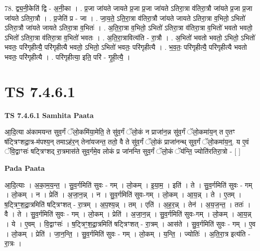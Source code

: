 \documentclass[17pt]{extarticle}
\begin{document}
78. द्व्य॒नी॒केति॑ द्वि - अ॒नी॒का । . प्र॒जा जा॑यते जायते प्र॒जा प्र॒जा जा॑यते ऽतिरा॒त्रा व॑तिरा॒त्रौ जा॑यते प्र॒जा प्र॒जा जा॑यते ऽतिरा॒त्रौ । . प्र॒जेति॑ प्र - जा । . जा॒य॒ते॒ ऽति॒रा॒त्रा व॑तिरा॒त्रौ जा॑यते जायते ऽतिरा॒त्रा व॒भितो॒ ऽभितो॑ ऽतिरा॒त्रौ जा॑यते जायते ऽतिरा॒त्रा व॒भितः॑ । . अ॒ति॒रा॒त्रा व॒भितो॒ ऽभितो॑ ऽतिरा॒त्रा व॑तिरा॒त्रा व॒भितो॑ भवतो भवतो॒ ऽभितो॑ ऽतिरा॒त्रा व॑तिरा॒त्रा व॒भितो॑ भवतः । . अ॒ति॒रा॒त्रावित्य॑ति - रा॒त्रौ । . अ॒भितो॑ भवतो भवतो॒ ऽभितो॒ ऽभितो॑ भवतः॒ परि॑गृहीत्यै॒ परि॑गृहीत्यै भवतो॒ ऽभितो॒ ऽभितो॑ भवतः॒ परि॑गृहीत्यै । . भ॒व॒तः॒ परि॑गृहीत्यै॒ परि॑गृहीत्यै भवतो भवतः॒ परि॑गृहीत्यै । . परि॑गृहीत्या॒ इति॒ परि॑ - गृ॒ही॒त्यै॒ । \newline
\pagebreak
{}

\section{ TS 7.4.6.1 }

\textbf{TS 7.4.6.1 } \newline
\textbf{Samhita Paata} \newline

आ॒दि॒त्या अ॑कामयन्त सुव॒र्गं ॅलो॒कमि॑या॒मेति॒ ते सु॑व॒र्गं ॅलो॒कं न प्राजा॑न॒न्न सु॑व॒र्गं ॅलो॒कमा॑य॒न् त ए॒तꣳ ष॑ट्त्रिꣳशद्रा॒त्र-म॑पश्य॒न् तमाऽह॑र॒न् तेना॑यजन्त॒ ततो॒ वै ते सु॑व॒र्गं ॅलो॒कं प्राजा॑नन्थ् सुव॒र्गं ॅलो॒कमा॑य॒न्॒. य ए॒वं ॅवि॒द्वाꣳसः॑ षट्त्रिꣳशद् रा॒त्रमास॑ते सुव॒र्गमे॒व लोकं प्र जा॑नन्ति सुव॒र्गं ॅलो॒कं ॅय॑न्ति॒ ज्योति॑रतिरा॒त्रो - [  ] \newline

\textbf{Pada Paata} \newline

आ॒दि॒त्याः । अ॒का॒म॒य॒न्त॒ । सु॒व॒र्गमिति॑ सुवः - गम् । लो॒कम् । इ॒या॒म॒ । इति॑ । ते । सु॒व॒र्गमिति॑ सुवः - गम् । लो॒कम् । न । प्रेति॑ । अ॒जा॒न॒न्न् । न । सु॒व॒र्गमिति॑ सुवः-गम् । लो॒कम् । आ॒य॒न्न् । ते । ए॒तम् । ष॒ट्त्रिꣳ॒॒श॒द्रा॒त्रमिति॑ षट्त्रिꣳशत् - रा॒त्रम् । अ॒प॒श्य॒न्न् । तम् । एति॑ । अ॒ह॒र॒न्न् । तेन॑ । अ॒य॒ज॒न्त॒ । ततः॑ । वै । ते । सु॒व॒र्गमिति॑ सुवः - गम् । लो॒कम् । प्रेति॑ । अ॒जा॒न॒न्न् । सु॒व॒र्गमिति॑ सुवः-गम् । लो॒कम् । आ॒य॒न्न् । ये । ए॒वम् । वि॒द्वाꣳसः॑ । ष॒ट्त्रिꣳ॒॒श॒द्रा॒त्रमिति॑ षट्त्रिꣳशत् - रा॒त्रम् । आस॑ते । सु॒व॒र्गमिति॑ सुवः - गम् । ए॒व । लो॒कम् । प्रेति॑ । जा॒न॒न्ति॒ । सु॒व॒र्गमिति॑ सुवः - गम् । लो॒कम् । य॒न्ति॒ । ज्योतिः॑ । अ॒ति॒रा॒त्र इत्य॑ति - रा॒त्रः ।  \newline
\end{document}
